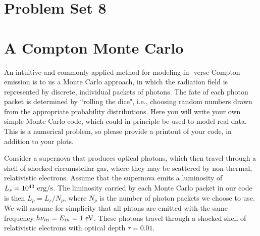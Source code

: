 \documentclass[11pt]{article}
\begin{document}
\pagestyle{empty}

\section*{\centering Problem Set 8}

\section{A Compton Monte Carlo}

An intuitive and commonly applied method for modeling in- verse Compton
emission is to us a Monte Carlo approach, in which the radiation field is
represented by discrete, individual packets of photons. The fate of each photon
packet is determined by ``rolling the dice", i.e., choosing random numbers drawn
from the appropriate probability distributions. Here you will write your own
simple Monte Carlo code, which could in principle be used to model real data.
This is a numerical problem, so please provide a printout of your code, in
addition to your plots.

Consider a supernova that produces optical photons, which then travel through a
shell of shocked circumstellar gas, where they may be scattered by non-thermal,
relativistic electrons. Assume that the supernova emits a luminosity of
$L_s=10^{43}~{\rm erg}/{\rm s}$.  The liminosity carried by each Monte
Carlo packet in our code is then $L_p=L_s/N_p$, where $N_p$ is the number of
photon packets we choose to use.  We will asuume for simplicity that all phtons are emitted with
the same frequency $h\nu_{in}=E_{in}=1~{\rm eV}$.  
These photons travel through a shocked shell of relativistic electrons with optical depth
$\tau=0.01$.
\end{document}
